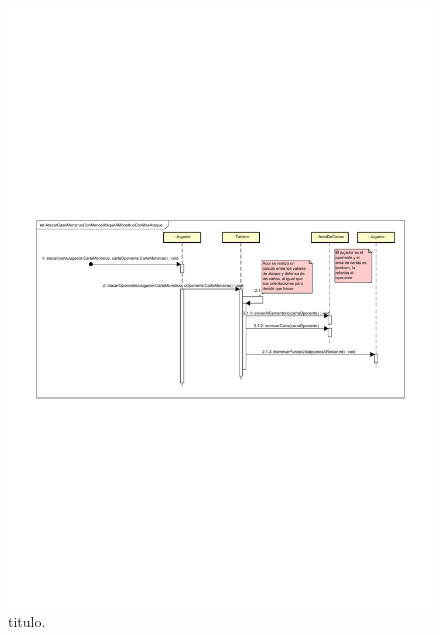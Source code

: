 \begin{figure}[H]
	\centering
	\includegraphics[scale=0.9]{includes/AtacarCasoMonstruoConMenosAtaqueAMonstruoConMasAtaque}
	\caption{titulo.}
	\label{AtacarCasoMonstruoConMenosAtaqueAMonstruoConMasAtaque}
\end{figure}
